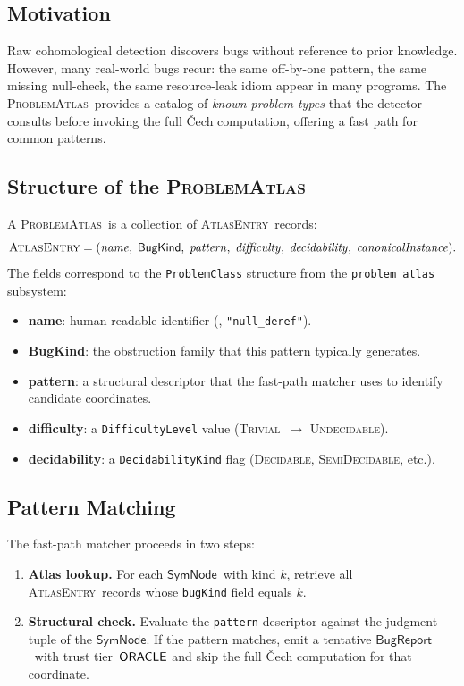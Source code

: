 \documentclass[11pt]{article}
\makeatletter
\newcommand{\BugKind}{\ensuremath{\mathsf{BugKind}}}          %
\newcommand{\BugRep}{\ensuremath{\mathsf{BugReport}}}          %
\newcommand{\ProbAtlas}{\textsc{ProblemAtlas}}    %
\newcommand{\AtlasEnt}{\textsc{AtlasEntry}}       %
\newcommand{\SymNode}{\ensuremath{\mathsf{SymNode}}}           %
\newcommand{\etc}{etc.\@\xspace}                    %
\makeatother
\begin{document}
\subsection{Motivation}

Raw cohomological detection discovers bugs without reference to prior
knowledge.  However, many real-world bugs recur: the same off-by-one
pattern, the same missing null-check, the same resource-leak idiom appear
in many programs.  The \ProbAtlas\ provides a catalog of \emph{known
problem types} that the detector consults before invoking the full
\v{C}ech computation, offering a fast path for common patterns.

\subsection{Structure of the \ProbAtlas}

A \ProbAtlas\ is a collection of \AtlasEnt\ records:
\[
  \AtlasEnt = (\mathit{name},\;\BugKind,\;\mathit{pattern},\;
               \mathit{difficulty},\;\mathit{decidability},\;
               \mathit{canonicalInstance}).
\]
The fields correspond to the \texttt{ProblemClass} structure from the
\texttt{problem\_atlas} subsystem:
\begin{itemize}[leftmargin=2em,topsep=2pt]
  \item \textbf{name}: human-readable identifier (\eg, \texttt{"null\_deref"}).
  \item \textbf{BugKind}: the obstruction family that this pattern
    typically generates.
  \item \textbf{pattern}: a structural descriptor that the fast-path
    matcher uses to identify candidate coordinates.
  \item \textbf{difficulty}: a \texttt{DifficultyLevel} value
    (\textsc{Trivial}~$\to$ \textsc{Undecidable}).
  \item \textbf{decidability}: a \texttt{DecidabilityKind} flag
    (\textsc{Decidable}, \textsc{SemiDecidable}, \etc).
\end{itemize}

\subsection{Pattern Matching}

The fast-path matcher proceeds in two steps:

\begin{enumerate}[leftmargin=2em,label=(\roman*)]
\item \textbf{Atlas lookup.}  For each \SymNode\ with kind $k$, retrieve
  all \AtlasEnt\ records whose \texttt{bugKind} field equals $k$.
\item \textbf{Structural check.}  Evaluate the \texttt{pattern} descriptor
  against the judgment tuple of the \SymNode.  If the pattern matches,
  emit a tentative \BugRep\ with trust tier~$\mathsf{ORACLE}$ and skip the
  full \v{C}ech computation for that coordinate.
\end{enumerate}
\end{document}
